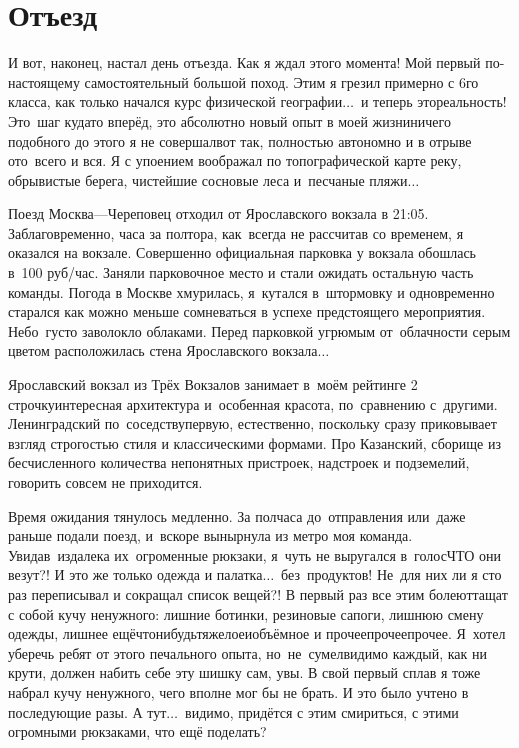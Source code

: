 \chapter{Отъезд}
\vepsianrose

И вот, наконец, настал день отъезда. Как я ждал этого момента! Мой первый по-настоящему самостоятельный большой поход. Этим я грезил примерно с 6\sdash го класса, как только начался курс физической географии$\ldots$~и теперь это\mdash реальность! Это~шаг куда\sdash то вперёд, это абсолютно новый опыт в моей жизни\mdash ничего подобного до этого я не совершал\mdash вот так, полностью автономно и в отрыве ото~всего и вся. Я с упоением воображал по топографической карте реку, обрывистые берега, чистейшие сосновые леса и~песчаные пляжи$\ldots$ 

Поезд Москва\thinspace---\thinspace Череповец отходил от Ярославского вокзала в 21:05. Заблаговременно, часа за полтора, как~всегда не рассчитав со временем, я оказался на вокзале. Совершенно официальная парковка у вокзала обошлась в~100 руб/час. Заняли парковочное место и стали ожидать остальную часть команды. Погода в Москве хмурилась, я~кутался в~штормовку и одновременно старался как можно меньше сомневаться в успехе предстоящего мероприятия. Небо~густо заволокло облаками. Перед парковкой угрюмым от~облачности серым цветом расположилась стена Ярославского вокзала$\ldots$

Ярославский вокзал из Трёх Вокзалов занимает в~моём рейтинге 2 строчку\mdash интересная архитектура и~особенная красота, по~сравнению с~другими. Ленинградский по~соседству\mdash первую, естественно, поскольку сразу приковывает взгляд строгостью стиля и классическими формами. Про Казанский, сборище из бесчисленного количества непонятных пристроек, надстроек и подземелий, говорить совсем не приходится.

Время ожидания тянулось медленно. За полчаса до~отправления или~даже раньше подали поезд, и~вскоре вынырнула из метро моя команда. Увидав~издалека их~огроменные рюкзаки, я~чуть не выругался в~голос\mdash ЧТО они везут?! И это же только одежда и палатка$\ldots$~без~продуктов! Не~для них ли я сто раз переписывал и сокращал список вещей?! В первый раз все этим болеют\mdash тащат с собой кучу ненужного: лишние ботинки, резиновые сапоги, лишнюю смену одежды, лишнее ещё\sdash что\sdash нибудь\sdash тяжелое\sdash и\sdash объёмное и прочее\sdash прочее\sdash прочее. Я~хотел уберечь ребят от этого печального опыта, но~не~сумел\mdash видимо каждый, как ни крути, должен набить себе эту шишку сам, увы. В свой первый сплав я тоже набрал кучу ненужного, чего вполне мог бы не брать. И это было учтено в последующие разы. А тут$\ldots$~видимо, придётся с этим смириться, с этими огромными рюкзаками, что ещё поделать?

